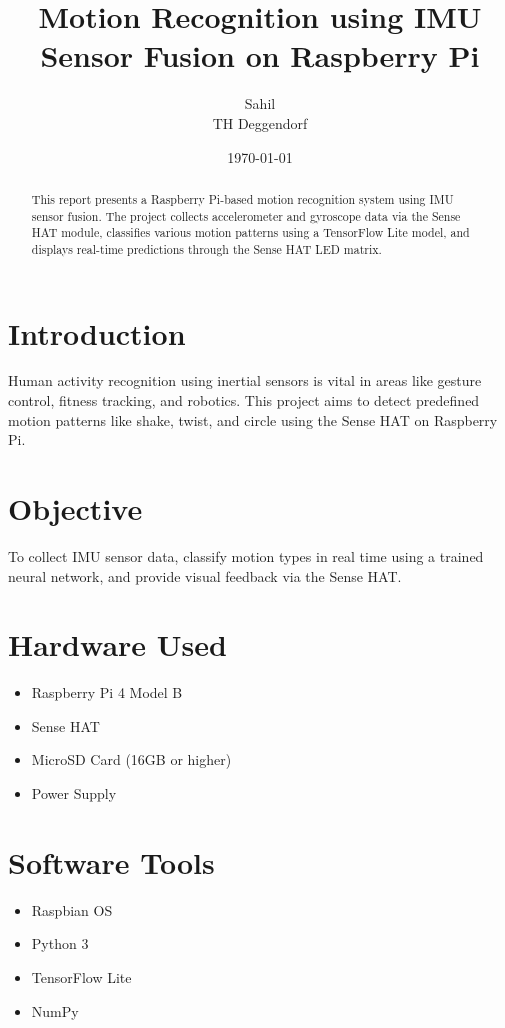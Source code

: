 \documentclass[12pt,a4paper]{article}
\title{Motion Recognition using IMU Sensor Fusion on Raspberry Pi}
\author{Sahil \\ TH Deggendorf}
\date{\today}
\begin{document}
\maketitle

\begin{abstract}
This report presents a Raspberry Pi-based motion recognition system using IMU sensor fusion. The project collects accelerometer and gyroscope data via the Sense HAT module, classifies various motion patterns using a TensorFlow Lite model, and displays real-time predictions through the Sense HAT LED matrix.
\end{abstract}

\section{Introduction}
Human activity recognition using inertial sensors is vital in areas like gesture control, fitness tracking, and robotics. This project aims to detect predefined motion patterns like shake, twist, and circle using the Sense HAT on Raspberry Pi.

\section{Objective}
To collect IMU sensor data, classify motion types in real time using a trained neural network, and provide visual feedback via the Sense HAT.

\section{Hardware Used}
\begin{itemize}
    \item Raspberry Pi 4 Model B
    \item Sense HAT
    \item MicroSD Card (16GB or higher)
    \item Power Supply
\end{itemize}

\section{Software Tools}
\begin{itemize}
    \item Raspbian OS
    \item Python 3
    \item TensorFlow Lite
    \item NumPy
\end{itemize}
\end{document}

